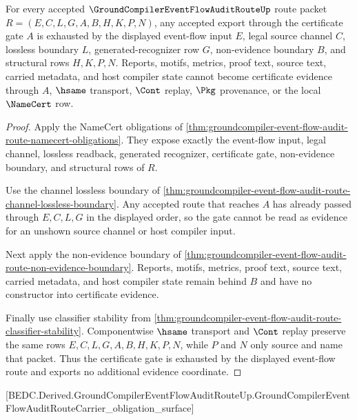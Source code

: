 \begin{theorem}
\label{thm:groundcompiler-event-flow-audit-route-certificate-gate-exhaustion}
For every accepted $\GroundCompilerEventFlowAuditRouteUp$ route packet $R=(E,C,L,G,A,B,H,K,P,N)$, any accepted export through the certificate gate $A$ is exhausted by the displayed event-flow input $E$, legal source channel $C$, lossless boundary $L$, generated-recognizer row $G$, non-evidence boundary $B$, and structural rows $H,K,P,N$. Reports, motifs, metrics, proof text, source text, carried metadata, and host compiler state cannot become certificate evidence through $A$, $\hsame$ transport, $\Cont$ replay, $\Pkg$ provenance, or the local $\NameCert$ row.
\end{theorem}
\begin{proof}
Apply the NameCert obligations of \autoref{thm:groundcompiler-event-flow-audit-route-namecert-obligations}. They expose exactly the event-flow input, legal channel, lossless readback, generated recognizer, certificate gate, non-evidence boundary, and structural rows of $R$.

Use the channel lossless boundary of \autoref{thm:groundcompiler-event-flow-audit-route-channel-lossless-boundary}. Any accepted route that reaches $A$ has already passed through $E,C,L,G$ in the displayed order, so the gate cannot be read as evidence for an unshown source channel or host compiler input.

Next apply the non-evidence boundary of \autoref{thm:groundcompiler-event-flow-audit-route-non-evidence-boundary}. Reports, motifs, metrics, proof text, source text, carried metadata, and host compiler state remain behind $B$ and have no constructor into certificate evidence.

Finally use classifier stability from \autoref{thm:groundcompiler-event-flow-audit-route-classifier-stability}. Componentwise $\hsame$ transport and $\Cont$ replay preserve the same rows $E,C,L,G,A,B,H,K,P,N$, while $P$ and $N$ only source and name that packet. Thus the certificate gate is exhausted by the displayed event-flow route and exports no additional evidence coordinate.
\end{proof}

[BEDC.Derived.GroundCompilerEventFlowAuditRouteUp.GroundCompilerEventFlowAuditRouteCarrier\_obligation\_surface]

